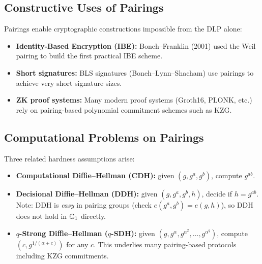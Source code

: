 \documentclass[11pt]{article}
\begin{document}
\subsection{Constructive Uses of Pairings}

Pairings enable cryptographic constructions impossible from the DLP alone:
\begin{itemize}
  \item \textbf{Identity-Based Encryption (IBE):} Boneh--Franklin (2001)
    used the Weil pairing to build the first practical IBE scheme.
  \item \textbf{Short signatures:} BLS signatures (Boneh--Lynn--Shacham)
    use pairings to achieve very short signature sizes.
  \item \textbf{ZK proof systems:} Many modern proof systems (Groth16,
    PLONK, etc.) rely on pairing-based polynomial commitment schemes such
    as KZG.
\end{itemize}

\subsection{Computational Problems on Pairings}

Three related hardness assumptions arise:
\begin{itemize}
  \item \textbf{Computational Diffie--Hellman (CDH):} given $(g, g^a,
    g^b)$, compute $g^{ab}$.
  \item \textbf{Decisional Diffie--Hellman (DDH):} given $(g, g^a, g^b,
    h)$, decide if $h = g^{ab}$.  Note: DDH is \emph{easy} in pairing
    groups (check $e(g^a, g^b) = e(g,h)$), so DDH does not hold in
    $\mathbb{G}_1$ directly.
  \item \textbf{$q$-Strong Diffie--Hellman ($q$-SDH):} given
    $(g, g^\alpha, g^{\alpha^2}, \ldots, g^{\alpha^q})$, compute
    $(c, g^{1/(\alpha+c)})$ for any $c$.  This underlies many
    pairing-based protocols including KZG commitments.
\end{itemize}

\end{document}
